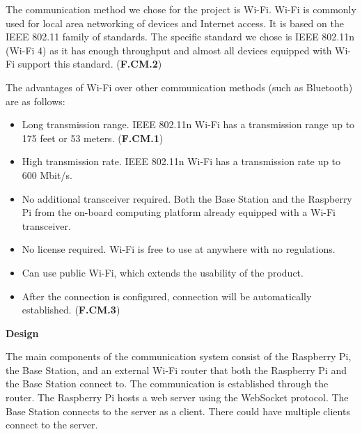 The communication method we chose for the project is Wi-Fi. Wi-Fi is commonly used for local area networking of devices and Internet access. It is based on the IEEE 802.11 family of standards. The specific standard we chose is IEEE 802.11n (Wi-Fi 4) as it has enough throughput and almost all devices equipped with Wi-Fi support this standard. (\textbf{F.CM.2})

The advantages of Wi-Fi over other communication methods (such as Bluetooth) are as follows:
\begin{itemize}
    \item Long transmission range. IEEE 802.11n Wi-Fi has a transmission range up to 175 feet or 53 meters. (\textbf{F.CM.1})
    \item High transmission rate. IEEE 802.11n Wi-Fi has a transmission rate up to 600 Mbit/s.
    \item No additional transceiver required. Both the Base Station and the Raspberry Pi from the on-board computing platform already equipped with a Wi-Fi transceiver.
    \item No license required. Wi-Fi is free to use at anywhere with no regulations.
    \item Can use public Wi-Fi, which extends the usability of the product.
    \item After the connection is configured, connection will be automatically established. (\textbf{F.CM.3})
\end{itemize}

\textbf{Design}

The main components of the communication system consist of the Raspberry Pi, the Base Station, and an external Wi-Fi router that both the Raspberry Pi and the Base Station connect to. The communication is established through the router. The Raspberry Pi hosts a web server using the WebSocket protocol. The Base Station connects to the server as a client. There could have multiple clients connect to the server.
